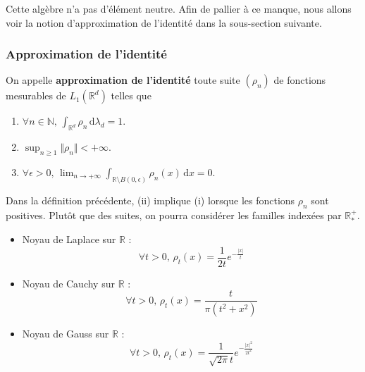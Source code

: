   \begin{remark}
    Cette algèbre n'a pas d'élément neutre. Afin de pallier à ce manque, nous allons voir la notion d'approximation de l'identité dans la sous-section suivante.
  \end{remark}

  \subsubsection{Approximation de l'identité}


  \begin{definition}
    On appelle \textbf{approximation de l'identité} toute suite $(\rho_n)$ de fonctions mesurables de $L_1(\mathbb{R}^d)$ telles que
    \begin{enumerate}[label=(\roman*)]
      \item $\forall n \in \mathbb{N}, \, \int_{\mathbb{R}^d} \rho_n \, \mathrm{d}\lambda_d = 1$.
      \item $\sup_{n \geq 1} \Vert \rho_n \Vert < +\infty$.
      \item $\forall \epsilon > 0, \, \lim_{n \rightarrow +\infty} \int_{\mathbb{R} \setminus B(0, \epsilon)} \rho_n(x) \, \mathrm{d}x = 0$.
    \end{enumerate}
  \end{definition}

  \begin{remark}
    Dans la définition précédente, (ii) implique (i) lorsque les fonctions $\rho_n$ sont positives. Plutôt que des suites, on pourra considérer les familles indexées par $\mathbb{R}_*^+$.
  \end{remark}

  \begin{example}
    \begin{itemize}
      \item Noyau de Laplace sur $\mathbb{R}$ :
      \[ \forall t > 0, \, \rho_t(x) = \frac{1}{2t}e^{-\frac{|x|}{t}} \]
      \item Noyau de Cauchy sur $\mathbb{R}$ :
      \[ \forall t > 0, \, \rho_t(x) = \frac{t}{\pi (t^2 + x^2)} \]
      \item Noyau de Gauss sur $\mathbb{R}$ :
      \[ \forall t > 0, \, \rho_t(x) = \frac{1}{\sqrt{2\pi} t}e^{-\frac{|x|^2}{2t^2}} \]
    \end{itemize}
  \end{example}


